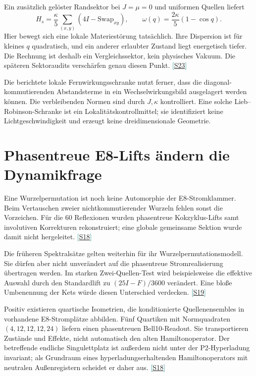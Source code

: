 \documentclass[11pt,a4paper,oneside,parskip=half,headings=normal,numbers=noenddot,bibliography=totoc]{scrreprt}
\newcommand{\src}[1]{\textcolor{teal}{\small[\hyperref[s:#1]{S#1}]}}
\begin{document}
Ein zusätzlich gelöster Randsektor bei $J=\mu=0$ und uniformen Quellen liefert
\[
 H_s=\frac{\kappa}{5}\sum_{(x,y)}(4I-\mathrm{Swap}_{xy}),
 \qquad\omega(q)=\frac{2\kappa}{5}(1-\cos q).
\]
Hier bewegt sich eine lokale Materiestörung tatsächlich. Ihre Dispersion ist für kleines $q$ quadratisch, und ein anderer erlaubter Zustand liegt energetisch tiefer. Die Rechnung ist deshalb ein Vergleichssektor, kein physisches Vakuum. Die späteren Sektoraudits verschärfen genau diesen Punkt. \src{23}

Die berichtete lokale Fernwirkungsschranke nutzt ferner, dass die diagonal-kommutierenden Abstandsterme in ein Wechselwirkungsbild ausgelagert werden können. Die verbleibenden Normen sind durch $J,\kappa$ kontrolliert. Eine solche Lieb--Robinson-Schranke ist ein Lokalitätskontrollmittel; sie identifiziert keine Lichtgeschwindigkeit und erzeugt keine dreidimensionale Geometrie.

\section{Phasentreue E8-Lifts ändern die Dynamikfrage}
Eine Wurzelpermutation ist noch keine Automorphie der E8-Stromklammer. Beim Vertauschen zweier nichtkommutierender Wurzeln fehlen sonst die Vorzeichen. Für die 60 Reflexionen wurden phasentreue Kokzyklus-Lifts samt involutiven Korrekturen rekonstruiert; eine globale gemeinsame Sektion wurde damit nicht hergeleitet. \src{18}

Die früheren Spektralsätze gelten weiterhin für ihr Wurzelpermutationsmodell. Sie dürfen aber nicht unverändert auf die phasentreue Stromrealisierung übertragen werden. Im starken Zwei-Quellen-Test wird beispielsweise die effektive Auswahl durch den Standardlift zu $(25I-F)/3600$ verändert. Eine bloße Umbenennung der Kets würde diesen Unterschied verdecken. \src{19}

Positiv existieren quartische Isometrien, die konditionierte Quellenensembles in vorhandene E8-Stromplätze abbilden. Fünf Quartiken mit Normquadraten $(4,12,12,12,24)$ liefern einen phasentreuen Bell10-Readout. Sie transportieren Zustände und Effekte, nicht automatisch den alten Hamiltonoperator. Der betreffende endliche Singulettplatz ist außerdem nicht unter der P2-Hyperladung invariant; als Grundraum eines hyperladungserhaltenden Hamiltonoperators mit neutralen Außenregistern scheidet er daher aus. \src{18}
\end{document}
